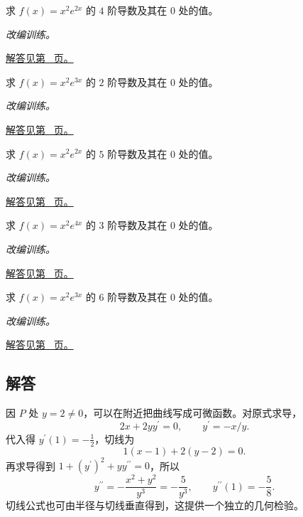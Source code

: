 \documentclass[UTF8,12pt,a4paper,fontset=fandol]{ctexart}
\begin{document}
\begin{example}\label{ex:c9q20}
求 $f(x)=x^2e^{2x}$ 的 $4$ 阶导数及其在 $0$ 处的值。
\par\textit{改编训练。}\par\hyperref[ans:c9q20]{解答见第~\pageref{ans:c9q20} 页。}
\end{example}
\begin{example}\label{ex:c9q21}
求 $f(x)=x^2e^{3x}$ 的 $2$ 阶导数及其在 $0$ 处的值。
\par\textit{改编训练。}\par\hyperref[ans:c9q21]{解答见第~\pageref{ans:c9q21} 页。}
\end{example}
\begin{example}\label{ex:c9q22}
求 $f(x)=x^2e^{2x}$ 的 $5$ 阶导数及其在 $0$ 处的值。
\par\textit{改编训练。}\par\hyperref[ans:c9q22]{解答见第~\pageref{ans:c9q22} 页。}
\end{example}
\begin{example}\label{ex:c9q23}
求 $f(x)=x^2e^{4x}$ 的 $3$ 阶导数及其在 $0$ 处的值。
\par\textit{改编训练。}\par\hyperref[ans:c9q23]{解答见第~\pageref{ans:c9q23} 页。}
\end{example}
\begin{example}\label{ex:c9q24}
求 $f(x)=x^2e^{3x}$ 的 $6$ 阶导数及其在 $0$ 处的值。
\par\textit{改编训练。}\par\hyperref[ans:c9q24]{解答见第~\pageref{ans:c9q24} 页。}
\end{example}
\subsection{解答}
\begin{solve}\label{ans:c9q1}
因 $P$ 处 $y=2\ne0$，可以在附近把曲线写成可微函数。对原式求导，
\[
2x+2yy^{{\prime}}=0,\qquad y^{{\prime}}=-x/y.
\]
代入得 $y^{\prime}(1)=-\frac{1}{2}$，切线为
\[
1(x-1)+2(y-2)=0.
\]
再求导得到 $1+(y^{\prime})^2+yy^{\prime\prime}=0$，所以
\[
y^{\prime\prime}=-\frac{x^2+y^2}{y^3}=-\frac{5}{y^3},\qquad y^{\prime\prime}(1)=-\frac{5}{8}.
\]
切线公式也可由半径与切线垂直得到，这提供一个独立的几何检验。
\end{solve}
\end{document}
